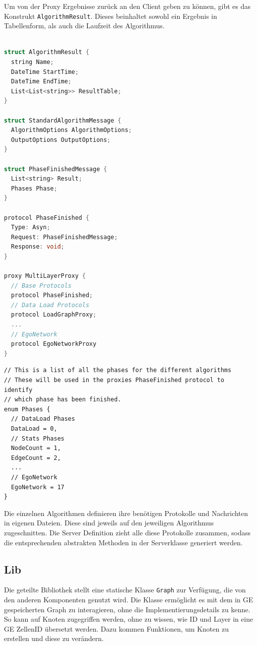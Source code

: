 Um von der Proxy Ergebnisse zurück an den Client geben zu können, gibt es das Konstrukt \verb|AlgorithmResult|. Dieses beinhaltet sowohl ein Ergebnis in Tabellenform, als auch die Laufzeit des Algorithmus.


\begin{lstlisting}[language=c, caption={Definition für die Proxy Protokolle.}]

struct AlgorithmResult {
  string Name;
  DateTime StartTime;
  DateTime EndTime;
  List<List<string>> ResultTable;
}

struct StandardAlgorithmMessage {
  AlgorithmOptions AlgorithmOptions;
  OutputOptions OutputOptions;
}

struct PhaseFinishedMessage {
  List<string> Result;
  Phases Phase;
}

protocol PhaseFinished {
  Type: Asyn;
  Request: PhaseFinishedMessage;
  Response: void;
}

proxy MultiLayerProxy {
  // Base Protocols
  protocol PhaseFinished;
  // Data Load Protocols
  protocol LoadGraphProxy;
  ...
  // EgoNetwork
  protocol EgoNetworkProxy
}
\end{lstlisting}


\begin{lstlisting}
// This is a list of all the phases for the different algorithms
// These will be used in the proxies PhaseFinished protocol to identify
// which phase has been finished.
enum Phases {
  // DataLoad Phases
  DataLoad = 0,
  // Stats Phases
  NodeCount = 1,
  EdgeCount = 2,
  ...
  // EgoNetwork
  EgoNetwork = 17
}
\end{lstlisting}


Die einzelnen Algorithmen definieren ihre benötigen Protokolle und Nachrichten in eigenen Dateien. Diese sind jeweils auf den jeweiligen Algorithmus zugeschnitten.
Die Server Definition zieht alle diese Protokolle zusammen, sodass die entsprechenden abstrakten Methoden in der Serverklasse generiert werden.

\subsection{Lib}


Die geteilte Bibliothek stellt eine statische Klasse \verb|Graph| zur Verfügung, die von den anderen Komponenten genutzt wird. Die Klasse ermöglicht es mit dem in GE gespeicherten Graph zu interagieren, ohne die Implementierungsdetails zu kenne. So kann auf Knoten zugegriffen werden, ohne zu wissen, wie ID und Layer in eine GE ZellenID übersetzt werden. 
Dazu kommen Funktionen, um Knoten zu erstellen und diese zu verändern.

